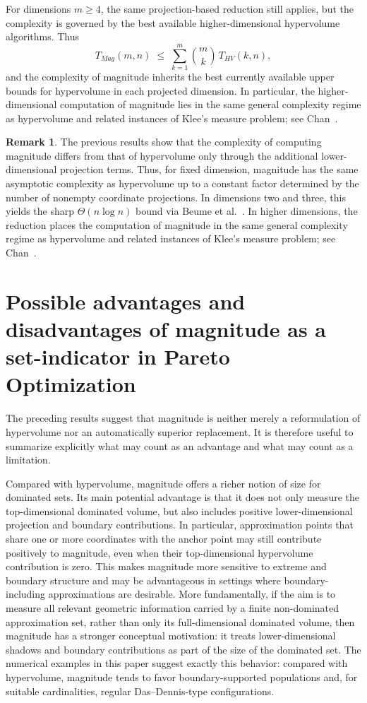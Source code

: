 \documentclass{article}
\def\HV{HV}%
\def\Mag{Mag}%
\theoremstyle{definition}
\newtheorem{remark}[theorem]{Remark}
\newcommand{\Mag}{\operatorname{Mag}}
\newcommand{\HV}{\operatorname{HV}}
\newcommand{\1}{\mathbf{1}}
\begin{document}
For dimensions \(m\ge 4\), the same projection-based reduction still applies, but the complexity is governed by the best available higher-dimensional hypervolume algorithms. Thus
\[
T_{\Mag}(m,n)\;\le\;\sum_{k=1}^{m}\binom{m}{k}\,T_{\HV}(k,n),
\]
and the complexity of magnitude inherits the best currently available upper bounds for hypervolume in each projected dimension. In particular, the higher-dimensional computation of magnitude lies in the same general complexity regime as hypervolume and related instances of Klee's measure problem; see Chan~\cite{Chan2013}.

\begin{remark}
The previous results show that the complexity of computing magnitude differs from that of hypervolume only through the additional lower-dimensional projection terms. Thus, for fixed dimension, magnitude has the same asymptotic complexity as hypervolume up to a constant factor determined by the number of nonempty coordinate projections. In dimensions two and three, this yields the sharp \(\Theta(n\log n)\) bound via Beume et al.~\cite{BeumeEtAl2009}. In higher dimensions, the reduction places the computation of magnitude in the same general complexity regime as hypervolume and related instances of Klee's measure problem; see Chan~\cite{Chan2013}.
\end{remark}

\section{Possible advantages and disadvantages of magnitude as a set-indicator in Pareto Optimization}

The preceding results suggest that magnitude is neither merely a reformulation of hypervolume nor an automatically superior replacement. It is therefore useful to summarize explicitly what may count as an advantage and what may count as a limitation.

Compared with hypervolume, magnitude offers a richer notion of size for dominated sets. Its main potential advantage is that it does not only measure the top-dimensional dominated volume, but also includes positive lower-dimensional projection and boundary contributions. In particular, approximation points that share one or more coordinates with the anchor point may still contribute positively to magnitude, even when their top-dimensional hypervolume contribution is zero. This makes magnitude more sensitive to extreme and boundary structure and may be advantageous in settings where boundary-including approximations are desirable. More fundamentally, if the aim is to measure all relevant geometric information carried by a finite non-dominated approximation set, rather than only its full-dimensional dominated volume, then magnitude has a stronger conceptual motivation: it treats lower-dimensional shadows and boundary contributions as part of the size of the dominated set. The numerical examples in this paper suggest exactly this behavior: compared with hypervolume, magnitude tends to favor boundary-supported populations and, for suitable cardinalities, regular Das--Dennis-type configurations.
\end{document}
